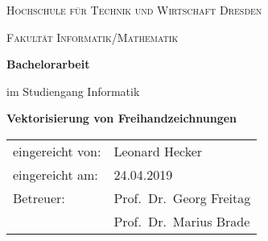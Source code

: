 \begin{titlepage}
    {
        \centering
        \large
        {\scshape Hochschule für Technik und Wirtschaft Dresden \par}
        {\scshape Fakultät Informatik/Mathematik \par}
        \vfill
        {\bfseries\huge Bachelorarbeit \par}
        \vspace{0.5cm}
        {im Studiengang Informatik \par}
        \vspace{1cm}
        {\bfseries\LARGE Vektorisierung von Freihandzeichnungen \par}
        \par
    }
    \vfill
    \begin{tabu}{ll}
        eingereicht von: & Leonard Hecker \\
        eingereicht am:  & 24.04.2019 \\
        Betreuer:        & Prof.\ Dr.\ Georg Freitag \\
                         & Prof.\ Dr.\ Marius Brade
    \end{tabu}
\end{titlepage}

\cleardoublepage{}
\tableofcontents{}
